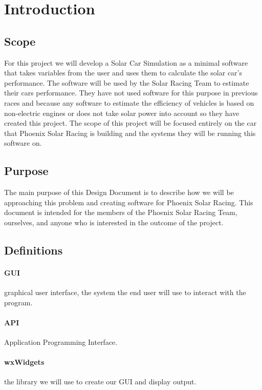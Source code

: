 \documentclass[onecolumn, draftclsnofoot,10pt, compsoc]{IEEEtran}
\begin{document}
\section{Introduction}

\subsection{Scope}
For this project we will develop a Solar Car Simulation as a minimal software that takes variables from the user and uses them to calculate the solar car's performance.
The software will be used by the Solar Racing Team to estimate their cars performance. 
They have not used software for this purpose in previous races and because any software to estimate the efficiency of vehicles is based on non-electric engines or does not take solar power into account so they have created this project. 
The scope of this project will be focused entirely on the car that Phoenix Solar Racing is building and the systems they will be running this software on.
    
    
\subsection{Purpose}
The main purpose of this Design Document is to describe how we will be approaching this problem and creating software for Phoenix Solar Racing.
This document is intended for the members of the Phoenix Solar Racing Team, ourselves, and anyone who is interested in the outcome of the project.

\subsection{Definitions}
\paragraph{\textbf{GUI}} graphical user interface, the system the end user will use to interact with the program.
\paragraph{\textbf{API}} Application Programming Interface.
\paragraph{\textbf{wxWidgets}} the library we will use to create our GUI and display output.
\end{document}
